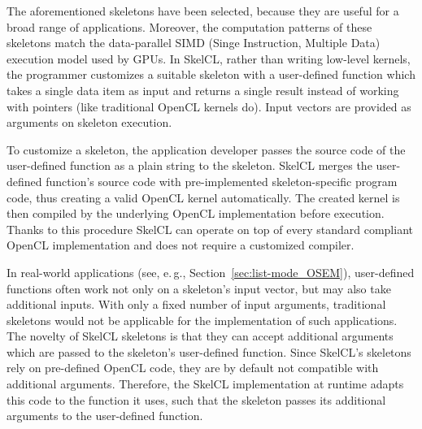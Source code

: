 The aforementioned skeletons have been selected, because they are useful for a broad range of applications.
Moreover, the computation patterns of these skeletons match the data-parallel SIMD (Singe Instruction, Multiple Data) execution model used by GPUs.
In SkelCL, rather than writing low-level kernels, the programmer customizes a suitable skeleton with a user-defined function which takes a single data item as input and returns a single result instead of working with pointers (like traditional OpenCL kernels do).
Input vectors are provided as arguments on skeleton execution.

To customize a skeleton, the application developer passes the source code of the user-defined function as a plain string to the skeleton.
SkelCL merges the user-defined function's source code with pre-implemented skeleton-specific program code, thus creating a valid OpenCL kernel automatically.
The created kernel is then compiled by the underlying OpenCL implementation before execution.
Thanks to this procedure SkelCL can operate on top of every standard compliant OpenCL implementation and does not require a customized compiler.

In real-world applications (see, e.\,g., Section~\ref{sec:list-mode_OSEM}), user-defined functions often work not only on a skeleton's input vector, but may also take additional inputs.
With only a fixed number of input arguments, traditional skeletons would not be applicable for the implementation of such applications.
The novelty of SkelCL skeletons is that they can accept additional arguments which are passed to the skeleton's user-defined function.
Since SkelCL's skeletons rely on pre-defined OpenCL code, they are by default not compatible with additional arguments.
Therefore, the SkelCL implementation at runtime adapts this code to the function it uses, such that the skeleton passes its additional arguments to the user-defined function.

